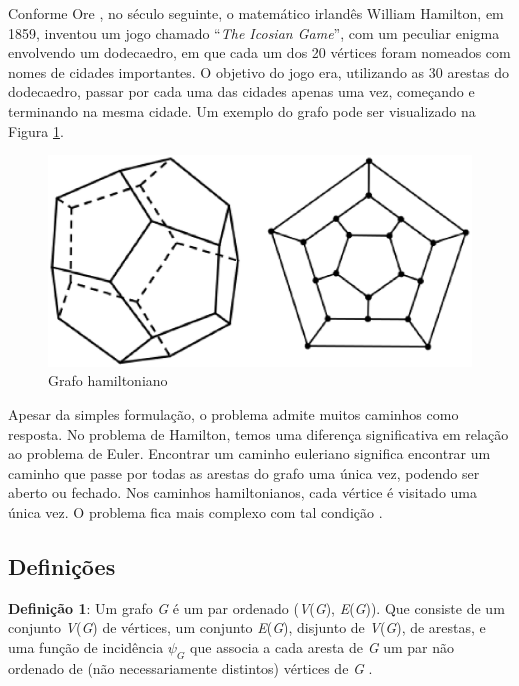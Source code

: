 Conforme Ore \cite{Ore:1963}, no século seguinte, o matemático irlandês William Hamilton, em 1859, inventou um jogo chamado ``\textit{The Icosian Game}'', com um peculiar enigma envolvendo um dodecaedro, em que cada um dos 20 vértices foram nomeados com nomes de cidades importantes. O objetivo do jogo era, utilizando as 30 arestas do dodecaedro, passar por cada uma das cidades apenas uma vez, começando e terminando na mesma cidade. Um exemplo do grafo pode ser visualizado na Figura \ref{grafo_hamiltoniano}.

\begin{figure}[!h]
	\centering
	\includegraphics[scale=0.3]{figuras/capitulo2/grafo_hamiltoniano.eps}
	\caption{Grafo hamiltoniano}
	\label{grafo_hamiltoniano}
\end{figure}

Apesar da simples formulação, o problema admite muitos caminhos como resposta. No problema de Hamilton, temos uma diferença significativa em relação ao problema de Euler. Encontrar um caminho euleriano significa encontrar um caminho que passe por todas as arestas do grafo uma única vez, podendo ser aberto ou fechado. Nos caminhos hamiltonianos, cada vértice é visitado uma única vez. O problema fica mais complexo com tal condição \cite{Costa:2011}.

\subsection{Definições}

\textbf{Definição 1}: Um grafo \textit{G} é um par ordenado (\textit{V}(\textit{G}), \textit{E}(\textit{G})). Que consiste de um conjunto \textit{V}(\textit{G}) de vértices, um conjunto \textit{E}(\textit{G}), disjunto de \textit{V}(\textit{G}), de arestas, e uma função de incidência $\psi_G$ que associa a cada aresta de \textit{G} um par não ordenado de (não necessariamente distintos) vértices de \textit{G} \cite{Bondy:2007}.

